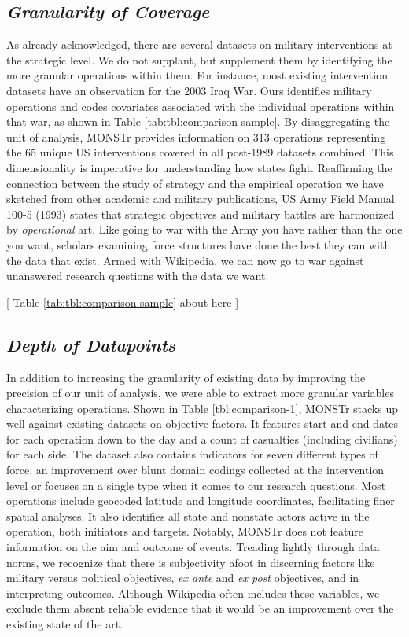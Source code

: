 \documentclass[fleqn,12pt]{article}
\begin{document}
\subsection*{\textit{Granularity of Coverage}}
As already acknowledged, there are several datasets on military interventions at the strategic level. We do not supplant, but supplement them by identifying the more granular operations within them. For instance, most existing intervention datasets have an observation for the 2003 Iraq War. Ours identifies military operations and codes covariates associated with the individual operations within that war, as shown in Table \ref{tab:tbl:comparison-sample}. By disaggregating the unit of analysis, MONSTr provides information on 313 operations representing the 65 unique US interventions covered in all post-1989 datasets combined. This dimensionality is imperative for understanding how states fight. Reaffirming the connection between the study of strategy and the empirical operation we have sketched from other academic and military publications, US Army Field Manual 100-5 (1993) states that strategic objectives and military battles are harmonized by \textit{operational} art. Like going to war with the Army you have rather than the one you want, scholars examining force structures have done the best they can with the data that exist. Armed with Wikipedia, we can now go to war against unanswered research questions with the data we want.

\begin{center}
	[ Table \ref{tab:tbl:comparison-sample} about here ]
\end{center}

\subsection*{\textit{Depth of Datapoints}}
In addition to increasing the granularity of existing data by improving the precision of our unit of analysis, we were able to extract more granular variables characterizing operations. Shown in Table \ref{tbl:comparison-1}, MONSTr stacks up well against existing datasets on objective factors. It features start and end dates for each operation down to the day and a count of casualties (including civilians) for each side. The dataset also contains indicators for seven different types of force, an improvement over blunt domain codings collected at the intervention level or focuses on a single type when it comes to our research questions. Most operations include geocoded latitude and longitude coordinates, facilitating finer spatial analyses. It also identifies all state and nonstate actors active in the operation, both initiators and targets. Notably, MONSTr does not feature information on the aim and outcome of events. Treading lightly through data norms, we recognize that there is subjectivity afoot in discerning factors like military versus political objectives, \textit{ex ante} and \textit{ex post} objectives, and in interpreting outcomes. Although Wikipedia often includes these variables, we exclude them absent reliable evidence that it would be an improvement over the existing state of the art.
\end{document}
